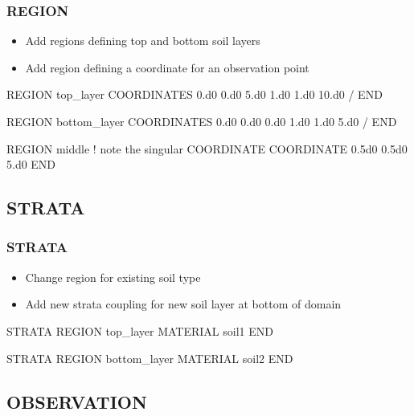 \documentclass{beamer}
\newcommand\bluecomment[1]{{{\color{blue} #1}}}
\newcommand\magentacomment[1]{{{\color{magenta} #1}}}
\begin{document}
\begin{frame}\frametitle{REGION}

\begin{itemize}
  \item Add regions defining top and bottom soil layers
  \item Add region defining a coordinate for an observation point
\end{itemize}

\begin{semiverbatim}


\magentacomment{
REGION top_layer
  COORDINATES
    0.d0 0.d0 5.d0
    1.d0 1.d0 10.d0
  /
END




REGION bottom_layer
  COORDINATES
    0.d0 0.d0 0.d0
    1.d0 1.d0 5.d0
  /
END

REGION middle    \bluecomment{! note the singular COORDINATE}
  COORDINATE 0.5d0 0.5d0 5.d0
END}

\end{semiverbatim}

\end{frame}

\subsection{STRATA}

\begin{frame}[fragile]\frametitle{STRATA}

\begin{itemize}
\item Change region for existing soil type
\item Add new strata coupling for new soil layer at bottom of domain
\end{itemize}

\begin{semiverbatim}

STRATA
  REGION \magentacomment{top_layer}
  MATERIAL soil1
END

\magentacomment{
STRATA
  REGION bottom_layer
  MATERIAL soil2
END}

\end{semiverbatim}

\end{frame}

\subsection{OBSERVATION}
\end{document}

